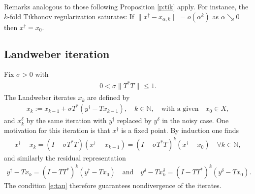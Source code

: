 \documentclass[10pt, a4paper]{iopart}
\newcommand{\IN}{\mathbb{N}}
\newcommand{\norm}[2]{     \| #1       \|_{ #2 }}
\newcommand{\normiii}[2]{\vert\kern-0.25ex\vert\kern-0.25ex\vert #1 \vert\kern-0.25ex \vert\kern-0.25ex\vert_{ #2 }}
\theoremstyle{remark}
\theoremstyle{definition}
\begin{document}
Remarks analogous to those following Proposition \ref{p:tik} apply.
%
For instance,
the $k$-fold Tikhonov regularization
saturates:
If $\norm{x^\dag - x_{\alpha, k}}{} = o(\alpha^k)$ as $\alpha \searrow 0$
then $x^\dag = x_0$.

%



\subsection{Landweber iteration}
\label{s:ip:L}

Fix $\sigma > 0$ with
\begin{align}
\label{e:tau}
	0 < \sigma \norm{T^* T}{} \leq 1
	.
\end{align}
%
The Landweber iterates $x_k$ are defined by
\begin{align}
\label{e:LW}
	x_k :=
	x_{k-1} + \sigma T^* (y^\dag - T x_{k-1}),
	\quad
	k \in \IN,
	\quad\text{with a given}\quad
	x_0 \in X,
\end{align}
and $x_k^\delta$ by the same iteration with $y^\dag$ replaced by $y^\delta$
in the noisy case.
%
%
%
%
%
%
One motivation for this iteration
is that
$x^\dag$ is a fixed point.
%
By induction
one finds
\begin{align}
	x^\dag - x_k
	=
	(I - \sigma T^* T)
	(x^\dag - x_{k-1})
	=
	(I - \sigma T^* T)^k 
	(x^\dag - x_0)
	\quad
	\forall
	k \in \IN
	,
\end{align}
and similarly
the residual representation
\begin{align}
\label{e:dade}
	y^\dag - T x_k
	=
	(I - T T^*)^k (y^\dag - T x_0)
	\quad\text{and}\quad
	y^\delta - T x_k^\delta
	=
	(I - T T^*)^k (y^\delta - T x_0)
	.
\end{align}
%
%
The condition \eqref{e:tau} 
therefore guarantees
nondivergence of the iterates.
\end{document}
